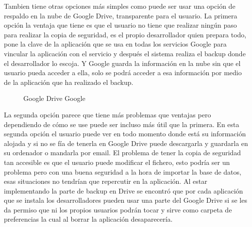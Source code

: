 Tambien tiene otras opciones más simples como puede ser usar una opción de respaldo en la nube de Google Drive, transparente para el usuario.
La primera opción la ventaja que tiene es que el usuario no tiene que realizar ningún paso para realizar la copia de seguridad, es el propio desarrollador quien prepara todo, pone la clave de la aplicación que se usa en todas los servicios Google para vincular la aplicación con el servicio y después el sistema realiza el backup donde el desarrollador lo escoja. Y Google guarda la información en la nube sin que el usuario pueda acceder a ella, solo se podrá acceder a esa información por medio de la aplicación que ha realizado el backup.

\begin{figure}[H] 
  \begin{center} 
    \caption{Google Drive Google} 
    \label{fig:Drive} 
  \end{center} 
\end{figure}

La segunda opción parece que tiene más problemas que ventajas pero dependiendo de cómo se use puede ser incluso más útil que la primera.
En esta segunda opción el usuario puede ver en todo momento donde está su información alojada y si no se fía de tenerla en Google Drive puede descargarla y guardarla en su ordenador o mandarla por email.
El problema de tener la copia de seguridad tan accesible es que el usuario puede modificar el fichero, esto podría ser un problema pero con una buena seguridad a la hora de importar la base de datos, esas situaciones no tendrían que repercutir en la aplicación.
Al estar implementando la parte de backup en Drive se encontró que por cada aplicación que se instala los desarrolladores pueden usar una parte del Google Drive si se les da permiso que ni los propios usuarios podrán tocar y sirve como carpeta de preferencias la cual al borrar la aplicación desaparecería.


